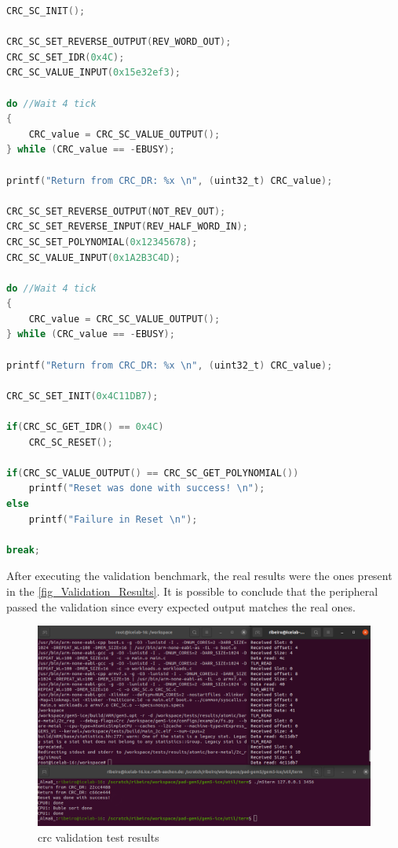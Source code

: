 \begin{lstlisting}[language=C, caption={CRC validation code}, label=validationCodeCRC]
CRC_SC_INIT();

CRC_SC_SET_REVERSE_OUTPUT(REV_WORD_OUT);
CRC_SC_SET_IDR(0x4C);
CRC_SC_VALUE_INPUT(0x15e32ef3);       

do //Wait 4 tick
{
	CRC_value = CRC_SC_VALUE_OUTPUT();
} while (CRC_value == -EBUSY);

printf("Return from CRC_DR: %x \n", (uint32_t) CRC_value);

CRC_SC_SET_REVERSE_OUTPUT(NOT_REV_OUT);
CRC_SC_SET_REVERSE_INPUT(REV_HALF_WORD_IN);
CRC_SC_SET_POLYNOMIAL(0x12345678);
CRC_SC_VALUE_INPUT(0x1A2B3C4D);

do //Wait 4 tick
{
	CRC_value = CRC_SC_VALUE_OUTPUT();
} while (CRC_value == -EBUSY);

printf("Return from CRC_DR: %x \n", (uint32_t) CRC_value); 

CRC_SC_SET_INIT(0x4C11DB7);

if(CRC_SC_GET_IDR() == 0x4C)
	CRC_SC_RESET();

if(CRC_SC_VALUE_OUTPUT() == CRC_SC_GET_POLYNOMIAL())
	printf("Reset was done with success! \n");
else
	printf("Failure in Reset \n");

break;
\end{lstlisting}

After executing the validation benchmark, the real results were the ones present in the \autoref{fig_Validation_Results}. It is possible to 
conclude that the peripheral passed the validation since every expected output matches the real ones. 

\begin{figure}[H]
	\centering
 	\includegraphics[width=0.8\linewidth]{Images/Validation_Results.png} 
 	\caption{\gls{crc} validation test results}
	\label{fig_Validation_Results}
\end{figure}


